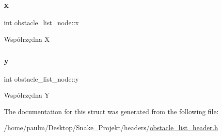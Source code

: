 \subsubsection{\texorpdfstring{x}{x}}
{\footnotesize\ttfamily int obstacle\+\_\+list\+\_\+node\+::x}

Współrzędna X \mbox{\label{structobstacle__list__node_adf07a5716da68f286493728cfb0d12fa}} 
\subsubsection{\texorpdfstring{y}{y}}
{\footnotesize\ttfamily int obstacle\+\_\+list\+\_\+node\+::y}

Współrzędna Y 

The documentation for this struct was generated from the following file\+:\begin{DoxyCompactItemize}
\item 
/home/paulm/\+Desktop/\+Snake\+\_\+\+Projekt/headers/\mbox{\hyperlink{obstacle__list__header_8h}{obstacle\+\_\+list\+\_\+header.\+h}}\end{DoxyCompactItemize}
